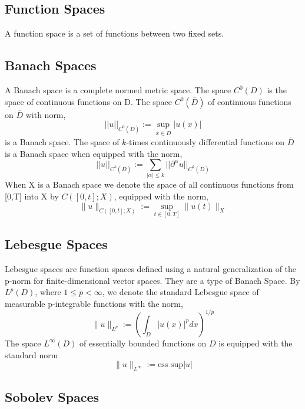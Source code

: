 \documentclass[12pt]{article}
\begin{document}
\begin{flushleft}
\subsection{Function Spaces}

A function space is a set of functions between two fixed sets.

\subsection{Banach Spaces}

A Banach space is a complete normed metric space. The space $C^0(D)$ is the space of continuous functions on D. The space $C^0(\overline{D})$ of continuous functions on $\overline{D}$ with norm,
$$||u||_{C^0(\overline{D})}:=\sup_{x\in \overline{D}}|u(x)|$$
is a Banach space. The space of $k$-times continuously differential functions on $\overline{D}$ is a Banach space when equipped with the norm,
$$||u||_{C^k(\overline{D})}:=\sum_{|\alpha|\leq k}||\partial^\alpha u||_{C^k(\overline{D})}$$
When X is a Banach space we denote the space of all continuous functions from [0,T] into X by $C([0,t];X)$, equipped with the norm,
$$\|u\|_{C([0,t];X)} := \sup_{t\in[0,T]}\|u(t)\|_X$$

\subsection{Lebesgue Spaces}

\qquad Lebesgue spaces are function spaces defined using a natural generalization of the p-norm for finite-dimensional vector spaces. They are a type of Banach Space. By $L^p(D)$, where $1\leq p < \infty$, we denote the standard Lebesgue space of measurable p-integrable functions with the norm, 
$$\|u\|_{L^p} := \left( \int_D |u(x)|^p dx \right)^{1/p}$$
The space $L^\infty(D)$ of essentially bounded functions on $D$ is equipped with the standard norm
$$\|u\|_{L^\infty} := \text{ess sup}|u|$$

\subsection{Sobolev Spaces}


\end{flushleft}
\end{document}
